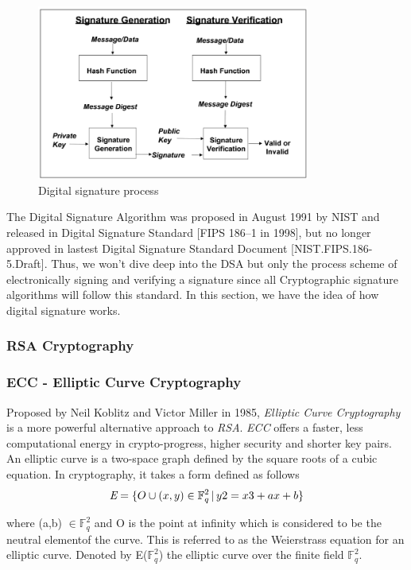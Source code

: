 \begin{figure}[h!]
	\centering
	\includegraphics[width=0.8\textwidth]{images/digital_signature.png}
	\caption[Digital signature process]{Digital signature process}
	\label{fig:digital_signature}
\end{figure}

The Digital Signature Algorithm was proposed in August 1991 by NIST and released in Digital Signature Standard [FIPS 186–1 in 1998], but no longer approved in lastest Digital Signature Standard Document [NIST.FIPS.186-5.Draft]. 
Thus, we won't dive deep into the DSA but only the process scheme of electronically signing and verifying a signature since all Cryptographic signature algorithms will follow this standard. 
In this section, we have the idea of how digital signature works.

\subsubsection{RSA Cryptography}

\subsubsection{ECC - Elliptic Curve Cryptography}
Proposed by Neil Koblitz and Victor Miller in 1985, \emph{Elliptic Curve Cryptography} is a more powerful alternative approach to \emph{RSA}. \emph{ECC} offers a faster, less computational energy in crypto-progress, higher security and shorter key pairs. 
An elliptic curve is a two-space graph defined by the square roots of a cubic equation. In cryptography, it takes a form defined as follows
\begin{equation} 
	\emph{E} = \{{O}\cup{(x,y)\in \mathbb{F}_{q}^2 \,|\, y2 = x3 + ax + b}\}
\end{equation}

where (a,b) $\in\mathbb{F}_{q}^2$ and O is the point at infinity which is considered to be the neutral elementof the curve.
This is referred to as the Weierstrass equation for an elliptic curve. 
Denoted by E($\mathbb{F}_{q}^2$) the elliptic curve over the finite field $\mathbb{F}_{q}^2$. 

